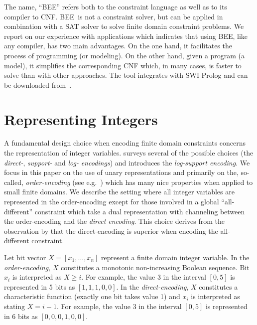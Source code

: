 \documentclass{tlp}
\newcommand{\bee}{\textsf{BEE}}
\begin{document}
The name, ``\bee'' refers both to the constraint language as well
as to its compiler to CNF. \bee\ is not a constraint solver, but can
be applied in combination with a SAT solver to solve finite domain
constraint problems.
We report on our experience with applications which indicates that
using \bee, like any compiler, has two main advantages. On the one
hand, it facilitates the process of programming (or modeling). On the
other hand, given a program (a model), it simplifies the corresponding
CNF which, in many cases, is faster to solve than with other
approaches.  The tool integrates with SWI Prolog and can be downloaded
from~\cite{bee2012}.


\section{Representing Integers}

A fundamental design choice when encoding finite domain constraints
concerns the representation of integer variables.
 surveys several of the possible
choices (the \emph{direct-}, \emph{support-} and \emph{log-}
\emph{encodings}) and introduces the \emph{log-support encoding}.
We focus in this paper on the use of unary representations and
primarily on the, so-called, \emph{order-encoding} (see
e.g.~\cite{baker,BailleuxB03}) which has many nice properties when
applied to small finite domains. We describe the setting where all
integer variables are represented in the order-encoding except for
those involved in a global ``all-different'' constraint which take a
dual representation with channeling between the order-encoding and the
\emph{direct encoding}. This choice derives from the observation by
 that the direct-encoding is superior when
encoding the all-different constraint.


Let bit vector $X=[x_1,\ldots,x_n]$ represent a finite domain integer
variable.  In the \emph{order-encoding}, $X$ constitutes a monotonic
non-increasing Boolean sequence. Bit $x_i$ is interpreted as $X\geq
i$.  For example, the value 3 in the interval $[0,5]$ is represented
in 5 bits as $[1,1,1,0,0]$.  In the \emph{direct-encoding}, $X$
constitutes a characteristic function (exactly one bit takes value 1)
and $x_i$ is interpreted as stating $X= i-1$.  For example, the value
3 in the interval $[0,5]$ is represented in 6 bits as $[0,0,0,1,0,0]$.
\end{document}

